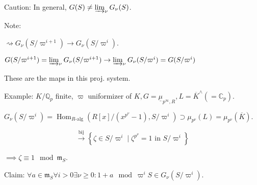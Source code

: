 \documentclass{article}
\theoremstyle{definition}
\numberwithin{theorem}{subsection}
\begin{document}
    Caution: In general, \(G(S) \neq \varinjlim_\nu G_\nu(S)\).

    Note:  \( \rightsquigarrow G_\nu(S / \varpi^{i+1}) \to G_\nu(S / \varpi^i)\).
    
    \(G(S / \varpi^{i+1}) = \varinjlim_\nu G_\nu(S / \varpi^{i+1}) \to \varinjlim_{\nu} G_\nu(S / \varpi^i) = G(S / \varpi^i)\)
    
    These are the maps in this proj. system.

    Example: \(K / \mathbb{Q}_p\) finite, \(\varpi\) uniformizer of \(K, G = \underline{\mu}_{p^{\infty}, R}, L = \overline{K}^\wedge(=\mathbb{C}_p)\).
    
    \(G_\nu (S / \varpi^i) = \operatorname{Hom}_{R\text{-alg}}\left( R[x] / (x^{p^\nu} - 1), S / \varpi^i \right) \supset \mu_{p^\nu}(L) = \mu_{p^\nu}(\overline{K})\).
    
    \[
        \xrightarrow{\text{bij}} \left\{ \zeta \in S / \varpi^i \mid \zeta^{p^\nu} = 1 \text{ in } S / \varpi^i \right\} 
    \]

    \(\implies \zeta \equiv 1 \mod \mathfrak{m}_S\).

    Claim: \(\forall a\in \mathfrak{m}_S \forall i > 0 \exists \nu \geq 0 : 1 + a \mod \varpi^i S \in G_\nu(S / \varpi^i)\).
\end{document}
